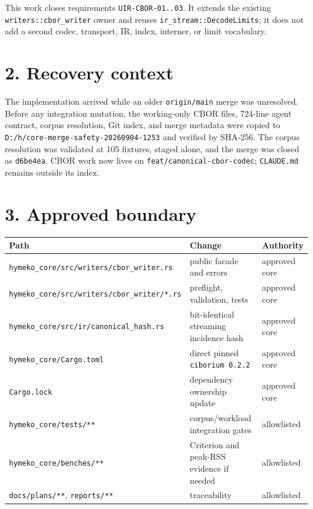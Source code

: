 \documentclass[11pt,a4paper]{article}
\begin{document}
This work closes requirements \texttt{UIR-CBOR-01..03}. It extends the existing
\texttt{writers::cbor\_writer} owner and reuses \texttt{ir\_stream::DecodeLimits}; it does not add a
second codec, transport, IR, index, interner, or limit vocabulary.

\section*{2. Recovery context}

The implementation arrived while an older \texttt{origin/main} merge was unresolved. Before any
integration mutation, the working-only CBOR files, 724-line agent contract, corpus resolution, Git
index, and merge metadata were copied to
\texttt{D:/h/core-merge-safety-20260904-1253} and verified by SHA-256. The corpus resolution was
validated at 105 fixtures, staged alone, and the merge was closed as \texttt{d6be4ea}. CBOR work now
lives on \texttt{feat/canonical-cbor-codec}; \texttt{CLAUDE.md} remains outside its index.

\section*{3. Approved boundary}

\begin{longtable}{@{}lll@{}}
\toprule
Path & Change & Authority \\
\midrule
\texttt{hymeko\_core/src/writers/cbor\_writer.rs} & public facade and errors & approved core \\
\texttt{hymeko\_core/src/writers/cbor\_writer/*.rs} & preflight, validation, tests & approved core \\
\texttt{hymeko\_core/src/ir/canonical\_hash.rs} & bit-identical streaming incidence hash & approved core \\
\texttt{hymeko\_core/Cargo.toml} & direct pinned \texttt{ciborium 0.2.2} & approved core \\
\texttt{Cargo.lock} & dependency ownership update & approved core \\
\texttt{hymeko\_core/tests/**} & corpus/workload integration gates & allowlisted \\
\texttt{hymeko\_core/benches/**} & Criterion and peak-RSS evidence if needed & allowlisted \\
\texttt{docs/plans/**}, \texttt{reports/**} & traceability & allowlisted \\
\bottomrule
\end{longtable}
\end{document}
